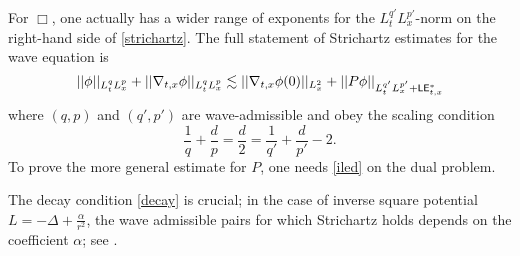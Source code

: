 \begin{remark}
	For $\Box$, one actually has a wider range of exponents for the $L^{q'}_t L^{p'}_x$-norm on the right-hand side of \eqref{strichartz}. The full statement of Strichartz estimates for the wave equation is 
	\[
		||\phi||_{L^q_t L^p_x} + ||\nabla_{t, x}\phi||_{L^q_t L^p_x}  \lesssim ||\nabla_{t, x} \phi(0)||_{L^2_x} + ||P \phi||_{L^{q'}_t L^{p'}_x + \mathsf{LE}^*_{t, x}}
	\]
where $(q, p)$ and $(q', p')$ are wave-admissible and obey the scaling condition 
	\[
		\frac1q + \frac{d}{p} = \frac{d}{2} = \frac{1}{q'} + \frac{d}{p'} - 2.
	\]	
	To prove the more general estimate for $P$, one needs \eqref{iled} on the dual problem. 
\end{remark}

\begin{remark}
	The decay condition \eqref{decay} is crucial; in the case of inverse square potential $L = - \Delta + \tfrac{\alpha}{r^2}$, the wave admissible pairs for which Strichartz holds depends on the coefficient $\alpha$; see \cite{BurqEtAl2004}. 
\end{remark}